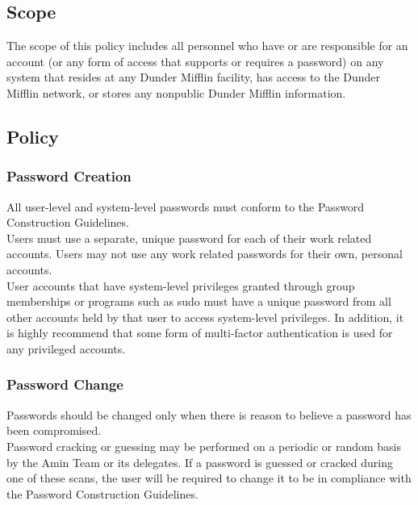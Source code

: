 \documentclass[11pt,onside]{article}
\begin{document}
\subsection{Scope}
The scope of this policy includes all personnel who have or are responsible for an account (or
any form of access that supports or requires a password) on any system that resides at any
Dunder Mifflin facility, has access to the Dunder Mifflin network, or stores any nonpublic Dunder Mifflin information.
\subsection{Policy}
\subsubsection{Password Creation}
All user-level and system-level passwords must conform to the Password Construction
Guidelines.\\
Users must use a separate, unique password for each of their work related accounts.
Users may not use any work related passwords for their own, personal accounts.\\
User accounts that have system-level privileges granted through group memberships or
programs such as sudo must have a unique password from all other accounts held by that
user to access system-level privileges. In addition, it is highly recommend that some
form of multi-factor authentication is used for any privileged accounts.\\
\subsubsection{Password Change}
Passwords should be changed only when there is reason to believe a password has been
compromised.\\
Password cracking or guessing may be performed on a periodic or random basis by the
Amin Team or its delegates. If a password is guessed or cracked during one of these scans, the user will be required to change it to be in compliance with the Password
Construction Guidelines.\\
\end{document}
